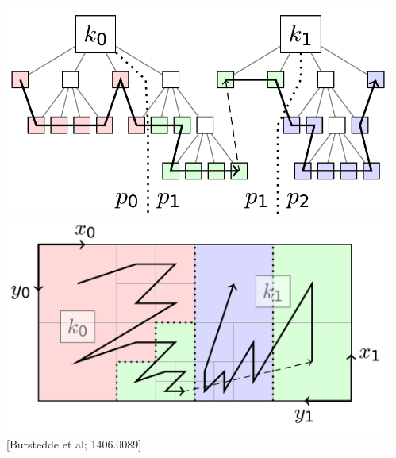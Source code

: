 {\begin{columns}
\begin{column}{.48\textwidth}
  \end{column}
\begin{column}{.4\textwidth} 
    \begin{center}
\includegraphics[width=\textwidth]{pictures/p4esttrees_cropped.pdf}\\
\includegraphics[width=\textwidth]{pictures/p4estblocks_cropped.pdf}
\vspace{-.3cm}  
{ \tiny [Burstedde et al; 1406.0089]}
   \end{center}
\end{column}
\end{columns}

}



